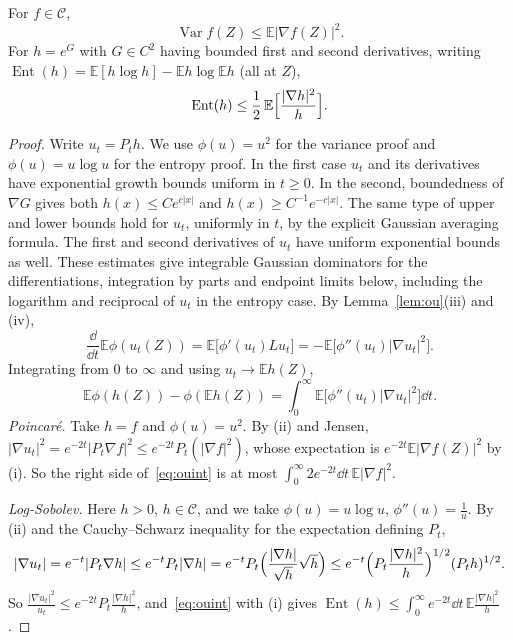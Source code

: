 \begin{theorem}\label{thm:gausslsi}
For $f\in\mathcal C$,
\[
\operatorname{Var}f(Z)\le\mathbb E|\nabla f(Z)|^2.
\]
For $h=e^G$ with $G\in C^2$ having bounded first and second derivatives, writing $\operatorname{Ent}(h)=\mathbb E[h\log h]-\mathbb Eh\log\mathbb Eh$ (all at $Z$),
\[
\operatorname{Ent}(h)\le\frac12\,\mathbb E\Bigl[\frac{|\nabla h|^2}h\Bigr].
\]
\end{theorem}
\begin{proof}
Write $u_t=P_th$. We use $\phi(u)=u^2$ for the variance proof and $\phi(u)=u\log u$ for the entropy proof. In the first case $u_t$ and its derivatives have exponential growth bounds uniform in $t\ge0$. In the second, boundedness of $\nabla G$ gives both $h(x)\le C e^{c|x|}$ and $h(x)\ge C^{-1}e^{-c|x|}$. The same type of upper and lower bounds hold for $u_t$, uniformly in $t$, by the explicit Gaussian averaging formula. The first and second derivatives of $u_t$ have uniform exponential bounds as well. These estimates give integrable Gaussian dominators for the differentiations, integration by parts and endpoint limits below, including the logarithm and reciprocal of $u_t$ in the entropy case. By Lemma~\ref{lem:ou}(iii) and (iv),
\[
\frac{\dd}{\dd t}\mathbb E\phi(u_t(Z))=\mathbb E\bigl[\phi'(u_t)Lu_t\bigr]=-\mathbb E\bigl[\phi''(u_t)|\nabla u_t|^2\bigr].
\]
Integrating from $0$ to $\infty$ and using $u_t\to\mathbb Eh(Z)$,
\begin{equation}\label{eq:ouint}
\mathbb E\phi(h(Z))-\phi(\mathbb Eh(Z))=\int_0^\infty\mathbb E\bigl[\phi''(u_t)|\nabla u_t|^2\bigr]\dd t.
\end{equation}
\emph{Poincar\'e.} Take $h=f$ and $\phi(u)=u^2$. By (ii) and Jensen, $|\nabla u_t|^2=e^{-2t}|P_t\nabla f|^2\le e^{-2t}P_t(|\nabla f|^2)$, whose expectation is $e^{-2t}\mathbb E|\nabla f(Z)|^2$
by (i). So the right side of~\eqref{eq:ouint} is at most $\int_0^\infty2e^{-2t}\dd t\,\mathbb E|\nabla f|^2$.

\emph{Log-Sobolev.} Here $h>0$, $h\in\mathcal C$, and we take $\phi(u)=u\log u$, $\phi''(u)=\frac1u$. By (ii) and the Cauchy--Schwarz inequality for the expectation defining $P_t$,
\[
|\nabla u_t|=e^{-t}|P_t\nabla h|\le e^{-t}P_t|\nabla h|=e^{-t}P_t\Bigl(\frac{|\nabla h|}{\sqrt h}\sqrt h\Bigr)\le e^{-t}\Bigl(P_t\frac{|\nabla h|^2}h\Bigr)^{1/2}(P_th)^{1/2}.
\]
So $\frac{|\nabla u_t|^2}{u_t}\le e^{-2t}P_t\frac{|\nabla h|^2}h$, and~\eqref{eq:ouint} with (i) gives $\operatorname{Ent}(h)\le\int_0^\infty e^{-2t}\dd t\,\mathbb E\frac{|\nabla h|^2}h$.
\end{proof}

